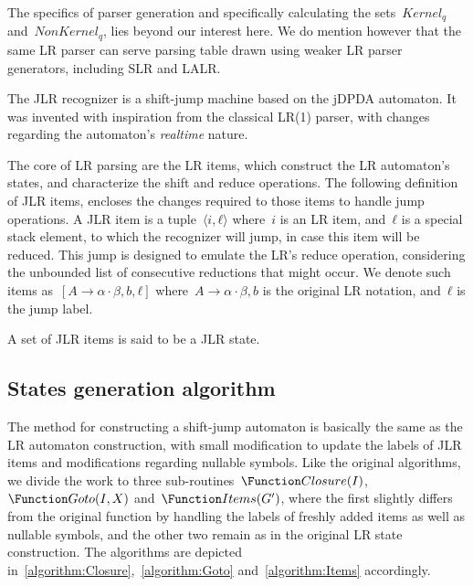The specifics of parser generation and specifically
  calculating the sets~$Kernel_{q}$ and~$NonKernel_{q}$, lies beyond our interest here.
We do mention however that the same LR parser can serve parsing table drawn using weaker LR parser generators,
including SLR and LALR\@.

The JLR recognizer is a shift-jump machine
  based on the jDPDA automaton.
It was invented with inspiration from the classical
  LR(1) parser, with changes regarding the automaton's
  \emph{realtime} nature.

The core of LR parsing are the LR items,
  which construct the LR automaton's states, and
  characterize the shift and reduce operations.
The following definition of JLR items,
  encloses the changes required to those items to handle
  jump operations.
A JLR item is a tuple~$⟨i,ℓ⟩$ where~$i$ is an
  LR item, and~$ℓ$ is a special stack element,
  to which the recognizer will jump, in case this item will
  be reduced.
This jump is designed to emulate the LR's
  reduce operation, considering the unbounded list of consecutive
  reductions that might occur.
We denote such items as~$[A→α·β, b ,ℓ]$
  where~$A→α·β, b$ is the original LR notation, and~$ℓ$
  is the jump label.

A set of JLR items is said to be a JLR state.

\subsection{States generation algorithm}
The method for constructing a shift-jump automaton
  is basically the same as the LR automaton construction,
  with small modification to update the labels of JLR items
  and modifications regarding nullable symbols.
Like the original algorithms, we divide the work to three
  sub-routines~$\Function Closure(I)$,~$\Function Goto(I,X)$ and~$\Function Items(G')$,
  where the first slightly differs from the original function by handling the
  labels of freshly added items as well as nullable symbols,
  and the other two remain as in the original LR state construction.
The algorithms are depicted in~\cref{algorithm:Closure},~\cref{algorithm:Goto}
  and~\cref{algorithm:Items} accordingly.


